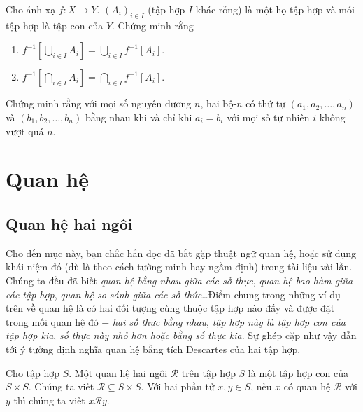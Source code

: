 \begin{exercise}
    Cho ánh xạ $f: X\to Y$. ${(A_{i})}_{i\in I}$ (tập hợp $I$ khác rỗng) là một họ tập hợp và mỗi tập hợp là tập con của $Y$. Chứng minh rằng
    \begin{enumerate}[label={(\roman*)}]
        \item $f^{-1}[\bigcup_{i\in I}A_{i}] = \bigcup_{i\in I} f^{-1}[A_{i}]$.
        \item $f^{-1}[\bigcap_{i\in I}A_{i}] = \bigcap_{i\in I} f^{-1}[A_{i}]$.
    \end{enumerate}
\end{exercise}

\begin{exercise}
    Chứng minh rằng với mọi số nguyên dương $n$, hai bộ-$n$ có thứ tự $(a_{1}, a_{2}, \ldots, a_{n})$ và $(b_{1}, b_{2}, \ldots, b_{n})$ bằng nhau khi và chỉ khi $a_{i} = b_{i}$ với mọi số tự nhiên $i$ không vượt quá $n$.
\end{exercise}

\section{Quan hệ}

\subsection{Quan hệ hai ngôi}

Cho đến mục này, bạn chắc hẳn đọc đã bắt gặp thuật ngữ quan hệ, hoặc sử dụng khái niệm đó (dù là theo cách tường minh hay ngầm định) trong tài liệu vài lần. Chúng ta đều đã biết \textit{quan hệ bằng nhau giữa các số thực}, \textit{quan hệ bao hàm giữa các tập hợp}, \textit{quan hệ so sánh giữa các số thức}\ldots Điểm chung trong những ví dụ trên về quan hệ là có hai đối tượng cùng thuộc tập hợp nào đấy và được đặt trong mối quan hệ đó $-$ \textit{hai số thực bằng nhau}, \textit{tập hợp này là tập hợp con của tập hợp kia}, \textit{số thực này nhỏ hơn hoặc bằng số thực kia}. Sự ghép cặp như vậy dẫn tới ý tưởng định nghĩa quan hệ bằng tích Descartes của hai tập hợp.

\begin{definition}
    Cho tập hợp $S$. Một quan hệ hai ngôi $\mathscr{R}$ trên tập hợp $S$ là một tập hợp con của $S\times S$. Chúng ta viết $\mathscr{R}\subseteq S\times S$. Với hai phần tử $x, y\in S$, nếu $x$ có quan hệ $\mathscr{R}$ với $y$ thì chúng ta viết $x\mathscr{R}y$.
\end{definition}

